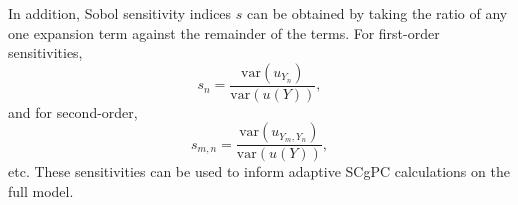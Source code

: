 In addition, Sobol sensitivity indices $s$ can be obtained by taking the ratio of any one expansion term against
the remainder of the terms.  For first-order sensitivities,
\begin{equation}
  s_n = \frac{\text{var}(u_{Y_n})}{\text{var}(u(Y))},
\end{equation}
and for second-order,
\begin{equation}
  s_{m,n} = \frac{\text{var}(u_{Y_m,Y_n})}{\text{var}(u(Y))},
\end{equation}
etc.  These sensitivities can be used to inform adaptive SCgPC calculations on the full model.
